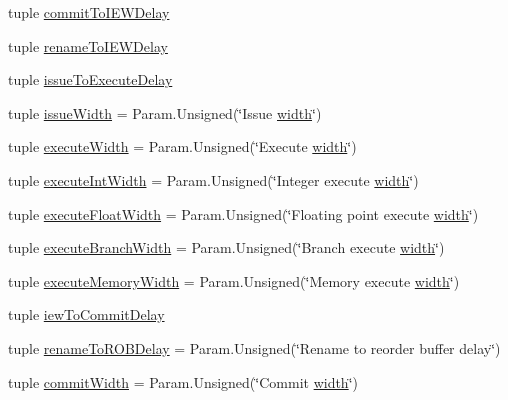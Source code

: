\begin{DoxyCompactItemize}
\item 
tuple \hyperlink{classOzoneCPU_1_1DerivOzoneCPU_afc77f4f67ebd047a4af56403975f4464}{commitToIEWDelay}
\item 
tuple \hyperlink{classOzoneCPU_1_1DerivOzoneCPU_acdec10386abd09a4724775d533fc65d4}{renameToIEWDelay}
\item 
tuple \hyperlink{classOzoneCPU_1_1DerivOzoneCPU_ab445ea6366a58d7753b058bd794548a8}{issueToExecuteDelay}
\item 
tuple \hyperlink{classOzoneCPU_1_1DerivOzoneCPU_a1e02adcb8a1e64fc82f4b389844d2f68}{issueWidth} = Param.Unsigned(\char`\"{}Issue \hyperlink{classOzoneCPU_1_1DerivOzoneCPU_a397bb3beea7b21f074bc75e1e71f132f}{width}\char`\"{})
\item 
tuple \hyperlink{classOzoneCPU_1_1DerivOzoneCPU_a5257b644f11c5f2c70417ef15932fb77}{executeWidth} = Param.Unsigned(\char`\"{}Execute \hyperlink{classOzoneCPU_1_1DerivOzoneCPU_a397bb3beea7b21f074bc75e1e71f132f}{width}\char`\"{})
\item 
tuple \hyperlink{classOzoneCPU_1_1DerivOzoneCPU_a0231660f86020f1dddc6d827aed5a711}{executeIntWidth} = Param.Unsigned(\char`\"{}Integer execute \hyperlink{classOzoneCPU_1_1DerivOzoneCPU_a397bb3beea7b21f074bc75e1e71f132f}{width}\char`\"{})
\item 
tuple \hyperlink{classOzoneCPU_1_1DerivOzoneCPU_a29617aaf82ccd8820fe66dd71d954fee}{executeFloatWidth} = Param.Unsigned(\char`\"{}Floating point execute \hyperlink{classOzoneCPU_1_1DerivOzoneCPU_a397bb3beea7b21f074bc75e1e71f132f}{width}\char`\"{})
\item 
tuple \hyperlink{classOzoneCPU_1_1DerivOzoneCPU_a85784e938a57b92cd9d1eeaaca8500b1}{executeBranchWidth} = Param.Unsigned(\char`\"{}Branch execute \hyperlink{classOzoneCPU_1_1DerivOzoneCPU_a397bb3beea7b21f074bc75e1e71f132f}{width}\char`\"{})
\item 
tuple \hyperlink{classOzoneCPU_1_1DerivOzoneCPU_a4251b67a387181c64371cc3f1bed89e7}{executeMemoryWidth} = Param.Unsigned(\char`\"{}Memory execute \hyperlink{classOzoneCPU_1_1DerivOzoneCPU_a397bb3beea7b21f074bc75e1e71f132f}{width}\char`\"{})
\item 
tuple \hyperlink{classOzoneCPU_1_1DerivOzoneCPU_a724a185702137da4a74c263b1ea63fec}{iewToCommitDelay}
\item 
tuple \hyperlink{classOzoneCPU_1_1DerivOzoneCPU_a1c17c9a7d634b03c7c2b7c0ba0ca21b9}{renameToROBDelay} = Param.Unsigned(\char`\"{}Rename to reorder buffer delay\char`\"{})
\item 
tuple \hyperlink{classOzoneCPU_1_1DerivOzoneCPU_a3df421018d58bcd7f02c3965f6b43ac3}{commitWidth} = Param.Unsigned(\char`\"{}Commit \hyperlink{classOzoneCPU_1_1DerivOzoneCPU_a397bb3beea7b21f074bc75e1e71f132f}{width}\char`\"{})

\end{DoxyCompactItemize}
